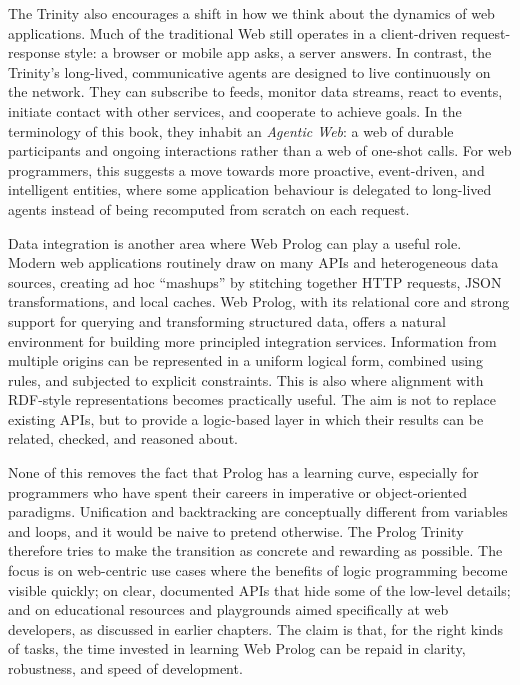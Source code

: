 The Trinity also encourages a shift in how we think about the dynamics of web applications. Much of the traditional Web still operates in a client-driven request-response style: a browser or mobile app asks, a server answers. In contrast, the Trinity's long-lived, communicative agents are designed to live continuously on the network. They can subscribe to feeds, monitor data streams, react to events, initiate contact with other services, and cooperate to achieve goals. In the terminology of this book, they inhabit an \emph{Agentic Web}: a web of durable participants and ongoing interactions rather than a web of one-shot calls. For web programmers, this suggests a move towards more proactive, event-driven, and intelligent entities, where some application behaviour is delegated to long-lived agents instead of being recomputed from scratch on each request.

Data integration is another area where Web Prolog can play a useful role. Modern web applications routinely draw on many APIs and heterogeneous data sources, creating ad hoc ``mashups'' by stitching together HTTP requests, JSON transformations, and local caches. Web Prolog, with its relational core and strong support for querying and transforming structured data, offers a natural environment for building more principled integration services. Information from multiple origins can be represented in a uniform logical form, combined using rules, and subjected to explicit constraints. This is also where alignment with RDF-style representations becomes practically useful. The aim is not to replace existing APIs, but to provide a logic-based layer in which their results can be related, checked, and reasoned about.

None of this removes the fact that Prolog has a learning curve, especially for programmers who have spent their careers in imperative or object-oriented paradigms. Unification and backtracking are conceptually different from variables and loops, and it would be naive to pretend otherwise. The Prolog Trinity therefore tries to make the transition as concrete and rewarding as possible. The focus is on web-centric use cases where the benefits of logic programming become visible quickly; on clear, documented APIs that hide some of the low-level details; and on educational resources and playgrounds aimed specifically at web developers, as discussed in earlier chapters. The claim is that, for the right kinds of tasks, the time invested in learning Web Prolog can be repaid in clarity, robustness, and speed of development.

